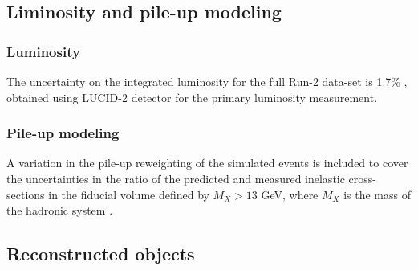 \subsection{Liminosity and pile-up modeling}
\label{subsec:SystOfLumiAndPU}

\subsubsection{Luminosity}
\label{subsec:SystOfLumi}
The uncertainty on the integrated luminosity for the full Run-2 data-set is 1.7\% \cite{ATLAS-CONF-2019-021}, obtained using LUCID-2 detector \cite{G.Avoni-2018} for the primary luminosity measurement.

\subsubsection{Pile-up modeling}
\label{subsec:SystOfPileupModelling}
A variation in the pile-up reweighting of the simulated events is included to cover the uncertainties in the ratio of the predicted and measured inelastic cross-sections in the fiducial volume defined by $M_{X}>13$ GeV, where $M_{X}$ is the mass of the hadronic system \cite{STDM-2015-05}.


\subsection{Reconstructed objects}
\label{subsec:SystOfRecoObjs}

